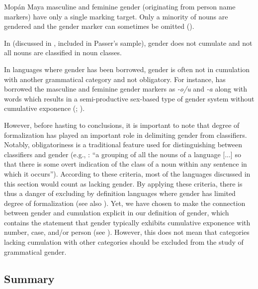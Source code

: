 \documentclass[output=collectionpaper]{langsci/langscibook}
\begin{document}
Mopán Maya masculine and feminine gender (originating from person name markers) have only a single marking target. Only a minority of nouns are gendered and the gender marker can sometimes be omitted (\citealt[133]{Contini-Morava2018}).

In  (discussed in , included in Passer's sample), gender does not cumulate and not all nouns are classified in noun classes.

In languages where gender has been borrowed, gender is often not in cumulation with another grammatical category and not obligatory. For instance,  has borrowed the  masculine and feminine gender markers as \textit{-o/u} and \textit{-a} along with  words which results in a semi-productive sex-based type of gender system without cumulative exponence (\citealt{Stolz2012}; ).

However, before hasting to conclusions, it is important to note that degree of formalization has played an important role in delimiting gender from classifiers. Notably, obligatoriness is a traditional feature used for distinguishing between classifiers and gender (e.g., \citealt[160]{Dixon1982}: ``a grouping of all the nouns of a language [...] so that there is some overt indication of the class of a noun within any sentence in which it occurs''). According to these criteria, most of the languages discussed in this section would count as lacking gender. By applying these criteria, there is thus a danger of excluding by definition languages where gender has limited degree of formalization (see also ). Yet, we have chosen to make the connection between gender and cumulation explicit in our definition of gender, which contains the statement that gender typically exhibits cumulative exponence with number, case, and/or person (see ). However, this does not mean that categories lacking cumulation with other categories should be excluded from the study of grammatical gender.

  \subsection{Summary}
\end{document}
